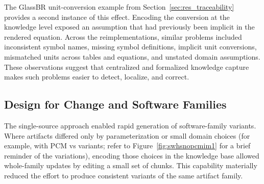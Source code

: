 The GlassBR unit-conversion example from
Section~\ref{sec:res_traceability} provides a second instance of this effect.
Encoding the conversion at the knowledge level exposed an assumption that had
previously been implicit in the rendered equation. Across the
reimplementations, similar problems included inconsistent symbol names, missing
symbol definitions, implicit unit conversions, mismatched units across tables
and equations, and unstated domain assumptions. These observations suggest that
centralized and formalized knowledge capture makes such problems easier to
detect, localize, and correct.

\subsection{Design for Change and Software Families}
\label{sec:design_change}
The single-source approach enabled rapid generation of software-family
variants. Where artifacts differed only by parameterization or small domain
choices (for example, \sw{} with PCM vs \np{} variants; refer to 
Figure~\ref{fig:swhsnopcmim1} for a brief reminder of the variations), encoding 
those choices in the knowledge base allowed whole-family updates by editing a 
small set of chunks. This capability materially reduced the effort to produce 
consistent variants of the same artifact family.

\begin{table}[h]
\centering
\caption{Key differences between SWHS and NoPCM Drasil implementations}
\label{tab:swhs_nopcm}
%
\end{table}

